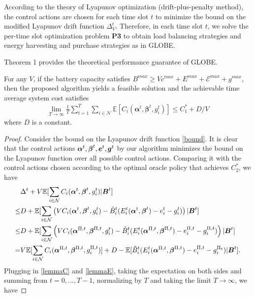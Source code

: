 \documentclass[12pt, draftclsnofoot, letterpaper, onecolumn]{IEEEtran}
\begin{document}
{According to the theory of Lyapunov optimization (drift-plus-penalty method), the control actions are chosen for each time slot $t$ to minimize the bound on the modified Lyapunov drift function $\Delta^t_V$. Therefore, in each time slot $t$, we solve the per-time slot optimization problem \textbf{P3} to obtain load balancing strategies and energy harvesting and purchase strategies as in GLOBE.

Theorem 1 provides the theoretical performance guarantee of GLOBE.

\begin{theorem}\label{onlinealg_bound}
For any $V$, if the battery capacity satisfies $B^{max} \geq V c^{max} + E^{max} + \mathcal{E}^{max} + g^{max}$, then the proposed algorithm yields a feasible solution and the achievable time average system cost satisfies
\begin{align}
\lim_{T\to\infty} \frac{1}{T}\sum_{t=1}^T \sum_{i\in\mathcal{N}} \mathbb{E}\left[C_i(\bm\alpha^t, \bm\beta^t, g^t_i)\right] \leq C^*_1 + D/V
\end{align}
where $D$ is a constant.
\end{theorem}
\begin{proof}
Consider the bound on the Lyapunov drift function \eqref{bound}. It is clear that the control actions $\mbox{\boldmath $\alpha$}^t, \mbox{\boldmath $\beta$}^t, {\boldsymbol{e}}^t, {\boldsymbol{g}}^t$ by our algorithm minimizes the bound on the Lyapunov function over all possible control actions. Comparing it with the control actions chosen according to the optimal oracle policy that achieves $C^*_2$, we have
\begin{align}
&\Delta^t + V\mathbb{E}[\sum_{i\in\mathcal{N}} C_i(\mbox{\boldmath $\alpha$}^t, \mbox{\boldmath $\beta$}^t, g^t_i)|{\boldsymbol{B}}^t] \nonumber\\
\leq& D + \mathbb{E}[\sum_{i\in\mathcal{N}}\left(V C_i(\mbox{\boldmath $\alpha$}^t, \mbox{\boldmath $\beta$}^t, g^t_i) - \tilde{B}^t_i (E_i^t(\mbox{\boldmath $\alpha$}^t, \mbox{\boldmath $\beta$}^t) - e^t_i -g^t_i) \right)|{\boldsymbol{B}}^t] \nonumber\\
\leq& D + \mathbb{E}[\sum_{i\in\mathcal{N}}\left(V C_i(\mbox{\boldmath $\alpha$}^{\Pi,t}, \mbox{\boldmath $\beta$}^{\Pi,t}, g^t_i) - \tilde{B}^t_i (E_i^t(\mbox{\boldmath $\alpha$}^{\Pi,t}, \mbox{\boldmath $\beta$}^{\Pi,t}) - e^{\Pi,t}_i -  g^{\Pi, t}_i)\right)|{\boldsymbol{B}}^t] \nonumber\\
=&V\mathbb{E}[\sum_{i\in\mathcal{N}} C_i(\mbox{\boldmath $\alpha$}^{\Pi,t}, \mbox{\boldmath $\beta$}^{\Pi,t}, g^{\Pi, t}_i)] + D - \mathbb{E}[\tilde{B}^t_i (E_i^t(\mbox{\boldmath $\alpha$}^{\Pi,t}, \mbox{\boldmath $\beta$}^{\Pi,t}) - e^{\Pi,t}_i - g^{\Pi_t}_i)|{\boldsymbol{B}}^t]. \nonumber
\end{align}
Plugging in \eqref{lemmaC} and \eqref{lemmaE}, taking the expectation on both sides and summing from $t = 0, ..., T-1$, normalizing by $T$ and taking the limit $T\to\infty$, we have

\end{proof}}
\end{document}
